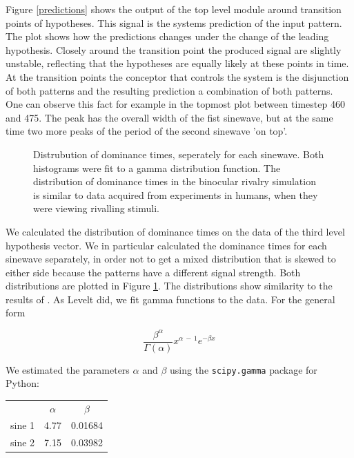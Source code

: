 \documentclass{frontiersSCNS} %
\begin{document}
    
	Figure \ref{predictions} shows the output of the top level module around transition points of hypotheses. This signal is the systems prediction of the input pattern. The plot shows how the predictions changes under the change of the leading hypothesis. Closely around the transition point the produced signal are slightly unstable, reflecting that the hypotheses are equally likely at these points in time. At the transition points the conceptor that controls the system is the disjunction of both patterns and the resulting prediction a combination of both patterns. One can observe this fact for example in the topmost plot between timestep 460 and 475. The peak has the overall width of the fist sinewave, but at the same time two more peaks of the period of the second sinewave 'on top'.
	
    \begin{figure}
           	\centering
       	    
      	\caption[Distrubution of dominance times]{Distrubution of dominance times, seperately for each sinewave. Both histograms were fit to a gamma distribution function. The distribution of dominance times in the binocular rivalry simulation is similar to data acquired from experiments in humans, when they were viewing rivalling stimuli.}
       	\label{dominance_times}
    \end{figure}
    
    We calculated the distribution of dominance times on the data of the third level hypothesis vector. We in particular calculated the dominance times for each sinewave separately, in order not to get a mixed distribution that is skewed to either side because the patterns have a different signal strength. Both distributions are plotted in Figure \ref{dominance_times}. The distributions show similarity to the results of \cite{Levelt1965}. As Levelt did, we fit gamma functions to the data. For the general form 
    
    
    \begin{equation}
{\frac {\beta ^{\alpha }}{\Gamma (\alpha )}}x^{\alpha \,-\,1}e^{-\beta x}
    \end{equation}
    
    We estimated the parameters $\alpha$ and $\beta$ using the \texttt{scipy.gamma} package for Python:



	\begin{center}
    \begin{tabular}{ r|c|c| }
    \multicolumn{1}{r}{}
     &  \multicolumn{1}{c}{$\alpha$}
     & \multicolumn{1}{c}{$\beta$} \\
    \cline{2-3}
    sine 1 & 4.77 & 0.01684 \\
    \cline{2-3}
    sine 2 & 7.15 & 0.03982 \\
    \cline{2-3}
    \end{tabular}
    \end{center}
\end{document}
